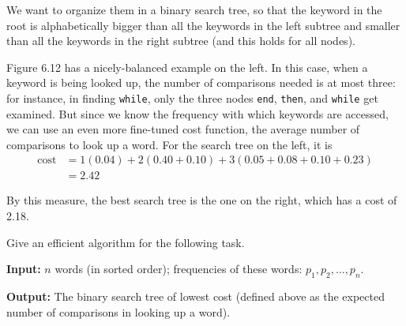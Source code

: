 \documentclass[12pt]{article}
\begin{document}
\begin{enumerate}[label=\textbf{6.\arabic*.}]
We want to organize them in a binary search tree, so that the keyword in the root is alphabetically
bigger than all the keywords in the left subtree and smaller than all the keywords in the right
subtree (and this holds for all nodes).

Figure 6.12 has a nicely-balanced example on the left. In this case, when a keyword is being
looked up, the number of comparisons needed is at most three: for instance, in finding \texttt{while},
only the three nodes \texttt{end}, \texttt{then}, and \texttt{while} get examined. But since we know the frequency
with which keywords are accessed, we can use an even more fine-tuned cost function, the average
number of comparisons to look up a word. For the search tree on the left, it is
\begin{align*}
\text{cost} &= 1(0.04) + 2(0.40 + 0.10) + 3(0.05 + 0.08 + 0.10 + 0.23)\\
&= 2.42
\end{align*}

By this measure, the best search tree is the one on the right, which has a cost of 2.18.

Give an efficient algorithm for the following task.

\textbf{Input:} $n$ words (in sorted order); frequencies of these words: $p_1, p_2, \ldots, p_n$.

\textbf{Output:} The binary search tree of lowest cost (defined above as the expected number
of comparisons in looking up a word).

\end{enumerate}
\end{document}
